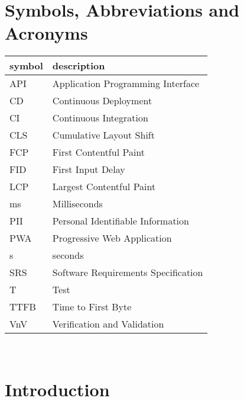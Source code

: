 \documentclass[12pt, titlepage]{article}
\begin{document}
\section{Symbols, Abbreviations and Acronyms}

\renewcommand{\arraystretch}{1.2}
\begin{tabular}{l l}
	\toprule
	\textbf{symbol} & \textbf{description}                \\
	\midrule
	API             & Application Programming Interface   \\
	CD              & Continuous Deployment               \\
	CI              & Continuous Integration              \\
	CLS             & Cumulative Layout Shift             \\
	FCP             & First Contentful Paint              \\
	FID             & First Input Delay                   \\
	LCP             & Largest Contentful Paint            \\
	ms              & Milliseconds                        \\
	PII             & Personal Identifiable Information   \\
	PWA             & Progressive Web Application         \\
	s               & seconds                             \\
	SRS             & Software Requirements Specification \\
	T               & Test                                \\
	TTFB            & Time to First Byte                  \\
	VnV             & Verification and Validation         \\
	\bottomrule
\end{tabular}\\

\newpage

\tableofcontents

\listoftables %

\listoffigures %

\newpage


\section{Introduction}
\end{document}
